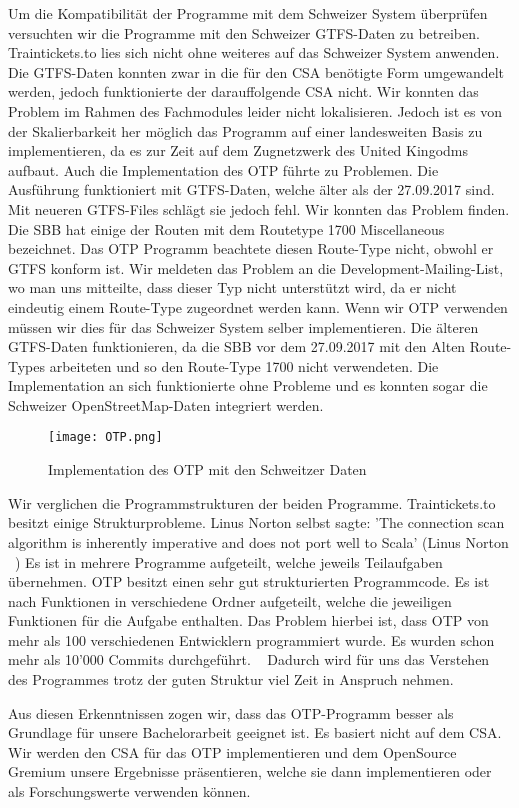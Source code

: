 Um die Kompatibilität der Programme mit dem Schweizer System überprüfen versuchten wir die Programme mit den Schweizer GTFS-Daten zu betreiben. Traintickets.to lies sich nicht ohne weiteres auf das Schweizer System anwenden. Die GTFS-Daten konnten zwar in die für den CSA benötigte Form umgewandelt werden, jedoch funktionierte der darauffolgende CSA nicht. Wir konnten das Problem im Rahmen des Fachmodules leider nicht lokalisieren. Jedoch ist es von der Skalierbarkeit her möglich das Programm auf einer landesweiten Basis zu implementieren, da es zur Zeit auf dem Zugnetzwerk des United Kingodms aufbaut. Auch die Implementation des OTP führte zu Problemen. Die Ausführung funktioniert mit GTFS-Daten, welche älter als der 27.09.2017 sind. Mit neueren GTFS-Files schlägt sie jedoch fehl. Wir konnten das Problem finden. Die SBB hat einige der Routen mit dem Routetype 1700 Miscellaneous bezeichnet. Das OTP Programm beachtete diesen Route-Type nicht, obwohl er GTFS konform ist. Wir meldeten das Problem an die Development-Mailing-List, wo man uns mitteilte, dass dieser Typ nicht unterstützt wird, da er nicht eindeutig einem Route-Type zugeordnet werden kann. Wenn wir OTP verwenden müssen wir dies für das Schweizer System selber implementieren. Die älteren GTFS-Daten funktionieren, da die SBB vor dem 27.09.2017 mit den Alten Route-Types arbeiteten und so den Route-Type 1700 nicht verwendeten. Die Implementation an sich funktionierte ohne Probleme und es konnten sogar die Schweizer OpenStreetMap-Daten integriert werden.

\begin{figure}[]
	\centering
	\texttt{[image: OTP.png]}
	\caption{Implementation des OTP mit den Schweitzer Daten}
	\label{fig:OTP}
\end{figure}

Wir verglichen die Programmstrukturen der beiden Programme. Traintickets.to besitzt einige Strukturprobleme. Linus Norton selbst sagte: 'The connection scan algorithm is inherently imperative and does not port well to Scala' (Linus Norton ~\cite{traintickets_git_pattern}) Es ist in mehrere Programme aufgeteilt, welche jeweils Teilaufgaben übernehmen. OTP besitzt einen sehr gut strukturierten Programmcode. Es ist nach Funktionen in verschiedene Ordner aufgeteilt, welche die jeweiligen Funktionen für die Aufgabe enthalten. Das Problem hierbei ist, dass OTP von mehr als 100 verschiedenen Entwicklern programmiert wurde. Es wurden schon mehr als 10'000 Commits durchgeführt. ~\cite{otp_website} Dadurch wird für uns das Verstehen des Programmes trotz der guten Struktur viel Zeit in Anspruch nehmen. 

Aus diesen Erkenntnissen zogen wir, dass das OTP-Programm besser als Grundlage für unsere Bachelorarbeit geeignet ist. Es basiert nicht auf dem CSA. Wir werden den CSA für das OTP implementieren und dem OpenSource Gremium unsere Ergebnisse präsentieren, welche sie dann implementieren oder als Forschungswerte verwenden können.
 


